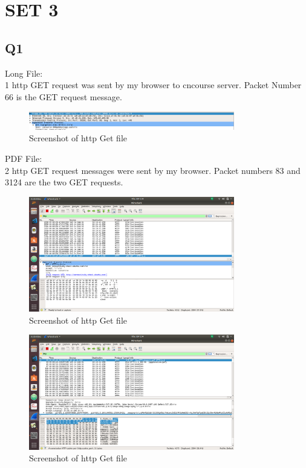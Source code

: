 \documentclass{article}
\begin{document}
\section{SET 3}

\subsection{Q1}
Long File: \\
1 http GET request was sent by my browser to cncourse server. Packet Number 66 is the GET request message. \\
  \begin{figure}[H]
 \centering
 \includegraphics[width=0.8\textwidth]{../Set3/q1/a.png}
 \caption{\label{fig:PING}Screenshot of http Get file}
 \end{figure}
 
 PDF File:\\
2 http GET request messages were sent by my browser. Packet numbers 83 and 3124 are the two GET requests.\\

  \begin{figure}[H]
 \centering
 \includegraphics[width=0.8\textwidth]{../Set3/q1/b.png}
 \caption{\label{fig:PING}Screenshot of http Get file}
 \end{figure}
 
   \begin{figure}[H]
 \centering
 \includegraphics[width=0.8\textwidth]{../Set3/q1/c.png}
 \caption{\label{fig:PING}Screenshot of http Get file}
 \end{figure}
\end{document}
